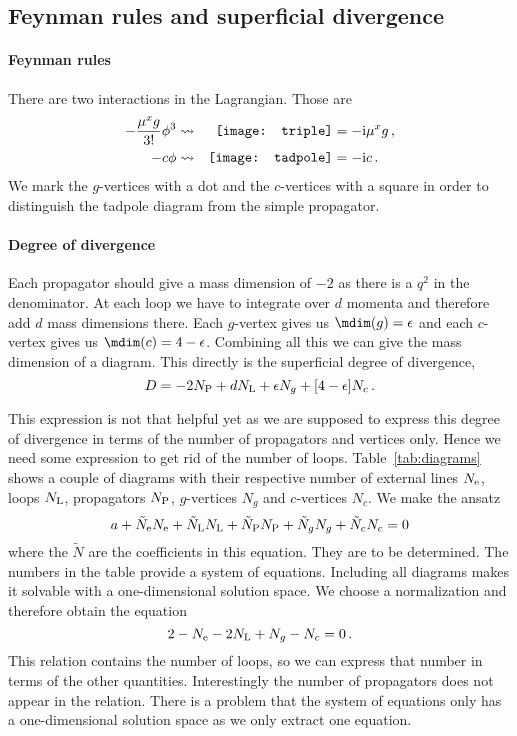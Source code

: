 \documentclass[11pt, english, fleqn, DIV=15, headinclude]{scrartcl}
\begin{document}
\subsection{Feynman rules and superficial divergence}

\paragraph{Feynman rules}

There are two interactions in the Lagrangian. Those are
\begin{align*}
    - \frac{\mu^x g}{3!} \phi^3
    &\leadsto &
    \vcenter{\hbox{\texttt{[image: triple]}}}
    &= - \iup \mu^x g \,,
    \\
    - c\phi
    &\leadsto &
    \vcenter{\hbox{\texttt{[image: tadpole]}}}
    &= - \iup c \,.
    \\
\end{align*}
We mark the $g$-vertices with a dot and the $c$-vertices with a square in order
to distinguish the tadpole diagram from the simple propagator.

\paragraph{Degree of divergence}

Each propagator should give a mass dimension of $-2$ as there is a $q^2$ in the
denominator. At each loop we have to integrate over $d$ momenta and therefore
add $d$ mass dimensions there. Each $g$-vertex gives us $\mdim(g) = \epsilon$
and each $c$-vertex gives us $\mdim(c) = 4 - \epsilon$. Combining all this we
can give the mass dimension of a diagram. This directly is the superficial
degree of divergence,
\[
    D = - 2 N_\text P + d N_\text L + \epsilon N_g + [4 - \epsilon] N_c \,.
\]

This expression is not that helpful yet as we are supposed to express this
degree of divergence in terms of the number of propagators and vertices only.
Hence we need some expression to get rid of the number of loops.
Table~\ref{tab:diagrams} shows a couple of diagrams with their respective
number of external lines $N_\text e$, loops $N_\text L$, propagators $N_\text
P$, $g$-vertices $N_g$ and $c$-vertices $N_c$. We make the ansatz
\[
    a
    + \tilde N_\text e N_\text e
    + \tilde N_\text L N_\text L
    + \tilde N_\text P N_\text P
    + \tilde N_g N_g
    + \tilde N_c N_c
    = 0
\]
where the $\tilde N$ are the coefficients in this equation. They are to be
determined. The numbers in the table provide a system of equations. Including
all diagrams makes it solvable with a one-dimensional solution space. We choose
a normalization and therefore obtain the equation
\[
    2
    - N_\text e
    -2 N_\text L
    + N_g
    - N_c
    = 0 \,.
\]
This relation contains the number of loops, so we can express that number in
terms of the other quantities. Interestingly the number of propagators does not
appear in the relation. There is a problem that the system of equations only
has a one-dimensional solution space as we only extract one equation.
\end{document}
